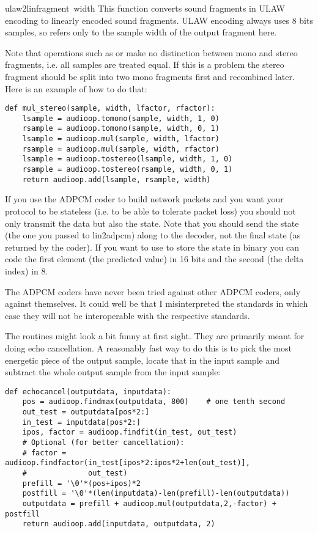 \begin{funcdesc}{ulaw2lin}{fragment\, width}
This function converts sound fragments in ULAW encoding to linearly
encoded sound fragments. ULAW encoding always uses 8 bits samples, so
 refers only to the sample width of the output fragment here.
\end{funcdesc}

Note that operations such as  or  make no
distinction between mono and stereo fragments, i.e. all samples are
treated equal.  If this is a problem the stereo fragment should be split
into two mono fragments first and recombined later.  Here is an example
of how to do that:
\bcode\begin{verbatim}
def mul_stereo(sample, width, lfactor, rfactor):
    lsample = audioop.tomono(sample, width, 1, 0)
    rsample = audioop.tomono(sample, width, 0, 1)
    lsample = audioop.mul(sample, width, lfactor)
    rsample = audioop.mul(sample, width, rfactor)
    lsample = audioop.tostereo(lsample, width, 1, 0)
    rsample = audioop.tostereo(rsample, width, 0, 1)
    return audioop.add(lsample, rsample, width)
\end{verbatim}\ecode

If you use the ADPCM coder to build network packets and you want your
protocol to be stateless (i.e. to be able to tolerate packet loss)
you should not only transmit the data but also the state. Note that
you should send the  state (the one you passed to
lin2adpcm) along to the decoder, not the final state (as returned by
the coder). If you want to use  to store the state in
binary you can code the first element (the predicted value) in 16 bits
and the second (the delta index) in 8.

The ADPCM coders have never been tried against other ADPCM coders,
only against themselves. It could well be that I misinterpreted the
standards in which case they will not be interoperable with the
respective standards.

The  routines might look a bit funny at first sight.
They are primarily meant for doing echo cancellation. A reasonably
fast way to do this is to pick the most energetic piece of the output
sample, locate that in the input sample and subtract the whole output
sample from the input sample:
\bcode\begin{verbatim}
def echocancel(outputdata, inputdata):
    pos = audioop.findmax(outputdata, 800)    # one tenth second
    out_test = outputdata[pos*2:]
    in_test = inputdata[pos*2:]
    ipos, factor = audioop.findfit(in_test, out_test)
    # Optional (for better cancellation):
    # factor = audioop.findfactor(in_test[ipos*2:ipos*2+len(out_test)], 
    #              out_test)
    prefill = '\0'*(pos+ipos)*2
    postfill = '\0'*(len(inputdata)-len(prefill)-len(outputdata))
    outputdata = prefill + audioop.mul(outputdata,2,-factor) + postfill
    return audioop.add(inputdata, outputdata, 2)
\end{verbatim}\ecode
